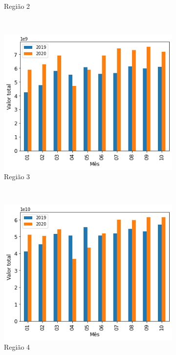 \begin{figure}[htb]
\begin{subfigure}[b]{0.45\textwidth}
        \caption{Região 2}
        \label{fig:pandemia:base-de-dados-13.2-comparacao-valor-total-por-regiao}
    \end{subfigure} ~ \\
    \begin{subfigure}[b]{0.45\textwidth}
        \includegraphics[scale=0.45]{images/base-de-dados-13.3-comparacao-valor-total-por-regiao.png}
        \caption{Região 3}
        \label{fig:pandemia:base-de-dados-13.3-comparacao-valor-total-por-regiao}
    \end{subfigure} ~ \quad
    \begin{subfigure}[b]{0.45\textwidth}
        \includegraphics[scale=0.45]{images/base-de-dados-13.4-comparacao-valor-total-por-regiao.png}
        \caption{Região 4}
        \label{fig:pandemia:base-de-dados-13.4-comparacao-valor-total-por-regiao}
    \end{subfigure} ~ \\
    \begin{subfigure}[b]{0.45\textwidth} 

\end{subfigure}
\end{figure}
